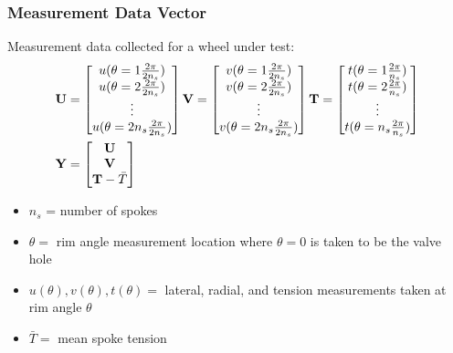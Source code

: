 \documentclass[mathserif]{beamer}
\begin{document}
\begin{frame}
\frametitle{Measurement Data Vector}
Measurement data collected for a wheel under test:
\begin{align*}
    \bf U &=  \begin{bmatrix}
        u(\theta = 1\frac{2\pi}{2n_s})\\
        u(\theta = 2\frac{2\pi}{2n_s})\\
        \vdots\\
        u(\theta = 2n_s\frac{2\pi}{2n_s})
        \end{bmatrix}
    \bf V = \begin{bmatrix}
        v(\theta = 1\frac{2\pi}{2n_s})\\
        v(\theta = 2\frac{2\pi}{2n_s})\\
        \vdots\\
        v(\theta = 2n_s\frac{2\pi}{2n_s})
    \end{bmatrix}
        \bf T = \begin{bmatrix}
        t(\theta = 1\frac{2\pi}{n_s})\\
        t(\theta = 2\frac{2\pi}{n_s})\\
        \vdots\\
        t(\theta = n_s\frac{2\pi}{n_s})
    \end{bmatrix} \\
    \bf Y &= \begin{bmatrix}
    \bf U\\\bf V\\ \mathbf {T}-\bar T
    \end{bmatrix}
    \end{align*}
\begin{itemize}
    \item $n_s$ = number of spokes
    \item $\theta=$ rim angle measurement location where $\theta = 0$ is taken to be the valve hole
    \item $u(\theta),v(\theta),t(\theta)=$ lateral, radial, and tension measurements taken at rim angle $\theta$
    \item $\bar T=$ mean spoke tension
\end{itemize}
\end{frame}
\end{document}
